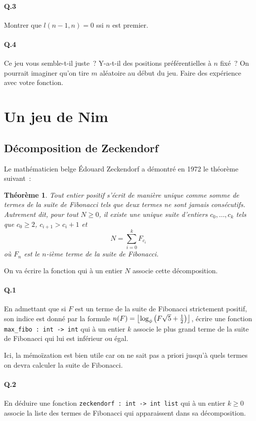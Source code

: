 \documentclass[10pt,a4paper]{article}
\DeclarePairedDelimiter\floor{\lfloor}{\rfloor}
\newtheorem{The}{Théorème}
\begin{document}
\paragraph{Q.3} Montrer que $l(n-1,n) = 0$ ssi $n$ est premier.
\paragraph{Q.4} Ce jeu vous semble-t-il juste~? Y-a-t-il des positions préférentielles à $n$ fixé~? On pourrait imaginer qu'on tire $m$ aléatoire au début du jeu. Faire des expérience avec votre fonction.

\section{Un jeu de Nim}
\subsection{Décomposition de Zeckendorf}
Le mathématicien belge Édouard Zeckendorf a démontré en 1972 le théorème suivant~:
\begin{The} Tout entier positif s'écrit de manière unique comme somme de termes de la suite de Fibonacci tels que deux termes ne sont jamais consécutifs. Autrement dit, pour tout $N \geq 0$, il existe une unique suite d'entiers  $c_0,\dots ,c_k$ tels que $c_0 \geq 2$, $c_{i+1} > c_i + 1$ et
\[N = \sum_{i=0}^{k} F_{c_i} \]
où $F_n$ est le $n$-ième terme de la suite de Fibonacci.
\end{The}
On va écrire la fonction qui à un entier $N$ associe cette décomposition.

\paragraph{Q.1} En admettant que si $F$ est un terme de la suite de Fibonacci strictement positif, son indice est donné par la formule $n(F)=\floor*{\log _{\phi} \left( F \sqrt{5} + \frac12 \right)}$, écrire une fonction \texttt{max\_fibo : int -> int} qui à un entier $k$ associe le plus grand terme de la suite de Fibonacci qui lui est inférieur ou égal.

Ici, la mémoïzation est bien utile car on ne sait pas a priori jusqu'à quels termes on devra calculer la suite de Fibonacci.

\paragraph{Q.2} En déduire une fonction \texttt{zeckendorf : int -> int list} qui à un entier $k \geq 0$ associe la liste des termes de Fibonacci qui apparaissent dans sa décomposition.
\end{document}
